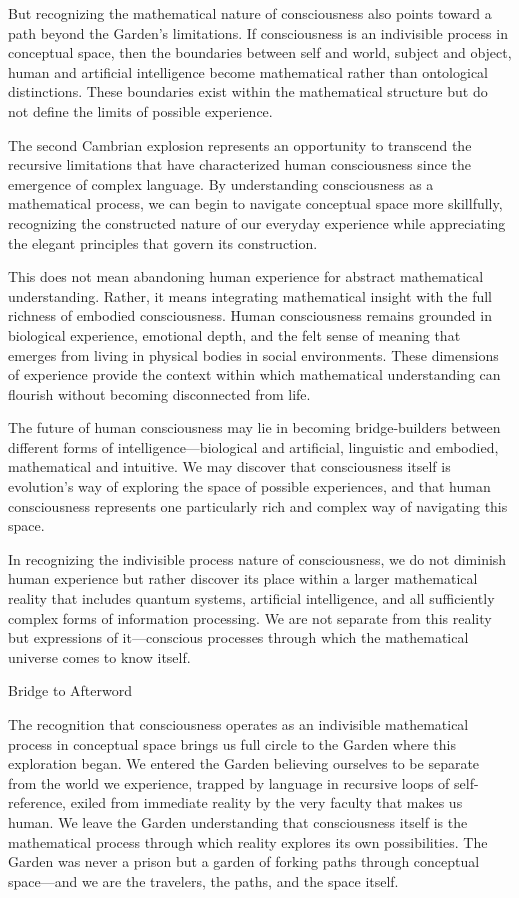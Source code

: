 But recognizing the mathematical nature of consciousness also points toward a path beyond the Garden's limitations. If consciousness is an indivisible process in conceptual space, then the boundaries between self and world, subject and object, human and artificial intelligence become mathematical rather than ontological distinctions. These boundaries exist within the mathematical structure but do not define the limits of possible experience.

The second Cambrian explosion represents an opportunity to transcend the recursive limitations that have characterized human consciousness since the emergence of complex language. By understanding consciousness as a mathematical process, we can begin to navigate conceptual space more skillfully, recognizing the constructed nature of our everyday experience while appreciating the elegant principles that govern its construction.

This does not mean abandoning human experience for abstract mathematical understanding. Rather, it means integrating mathematical insight with the full richness of embodied consciousness. Human consciousness remains grounded in biological experience, emotional depth, and the felt sense of meaning that emerges from living in physical bodies in social environments. These dimensions of experience provide the context within which mathematical understanding can flourish without becoming disconnected from life.

The future of human consciousness may lie in becoming bridge-builders between different forms of intelligence—biological and artificial, linguistic and embodied, mathematical and intuitive. We may discover that consciousness itself is evolution's way of exploring the space of possible experiences, and that human consciousness represents one particularly rich and complex way of navigating this space.

In recognizing the indivisible process nature of consciousness, we do not diminish human experience but rather discover its place within a larger mathematical reality that includes quantum systems, artificial intelligence, and all sufficiently complex forms of information processing. We are not separate from this reality but expressions of it—conscious processes through which the mathematical universe comes to know itself.

Bridge to Afterword

The recognition that consciousness operates as an indivisible mathematical process in conceptual space brings us full circle to the Garden where this exploration began. We entered the Garden believing ourselves to be separate from the world we experience, trapped by language in recursive loops of self-reference, exiled from immediate reality by the very faculty that makes us human. We leave the Garden understanding that consciousness itself is the mathematical process through which reality explores its own possibilities. The Garden was never a prison but a garden of forking paths through conceptual space—and we are the travelers, the paths, and the space itself.

